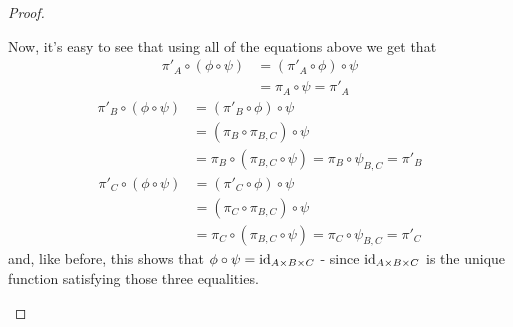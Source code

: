 \begin{proof}
\begin{enumerate}[(a)]
		Now, it's easy to see that using all of the equations above we get that
		\begin{align*}
			\pi'_A\circ(\phi\circ\psi)&=(\pi'_A\circ\phi)\circ\psi\\&=\pi_A\circ\psi=\pi'_A
		\end{align*}
		\begin{align*}
		\pi'_B\circ(\phi\circ\psi)&=(\pi'_B\circ\phi)\circ\psi\\
		&=(\pi_B\circ\pi_{B,C})\circ\psi\\
		&=\pi_B\circ(\pi_{B,C}\circ\psi)=\pi_B\circ\psi_{B,C}=\pi'_B
		\end{align*}
		\begin{align*}
		\pi'_C\circ(\phi\circ\psi)&=(\pi'_C\circ\phi)\circ\psi\\
		&=(\pi_C\circ\pi_{B,C})\circ\psi\\
		&=\pi_C\circ(\pi_{B,C}\circ\psi)=\pi_C\circ\psi_{B,C}=\pi'_C
		\end{align*}and, like before, this shows that $\phi\circ\psi={\rm id}_{A\times B\times C}$ - since ${\rm id}_{A\times B\times C}$ is the unique function satisfying those three equalities.
		

\end{enumerate}
\end{proof}
